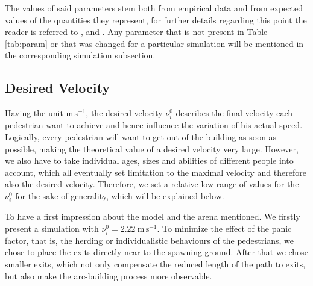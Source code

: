 The values of said parameters stem both from empirical data and from expected values of the quantities they represent, for further details regarding this point the reader is referred to \cite{Helbing2000}, \cite{Zainuddin2010} and \cite{Wang2016}. Any parameter that is not present in Table \ref{tab:param} or that was changed for a particular simulation will be mentioned in the corresponding simulation subsection.


\subsection{Desired Velocity} \label{sec:6.1-velocity}
Having the unit $\si{\meter\,\second^{-1}}$, the desired velocity $\nu_i^0$ describes the final velocity each pedestrian want to achieve and hence influence the variation of his actual speed. Logically, every pedestrian will want to get out of the building as soon as possible, making the theoretical value of a desired velocity very large. However, we also have to take individual ages, sizes and abilities of different people into account, which all eventually set limitation to the maximal velocity and therefore also the desired velocity. Therefore, we set a relative low range of values for the $\nu_i^0$ for the sake of generality, which will be explained below. 

To have a first impression about the model and the arena mentioned. We firstly present a simulation with $\nu_i^0 = \SI{2.22}{\meter\,\second^{-1}}$. To minimize the effect of the panic factor, that is, the herding or individualistic behaviours of the pedestrians, we chose to place the exits directly near to the spawning ground. After that we chose smaller exits, which not only compensate the reduced length of the path to exits, but also make the arc-building process more observable. 

